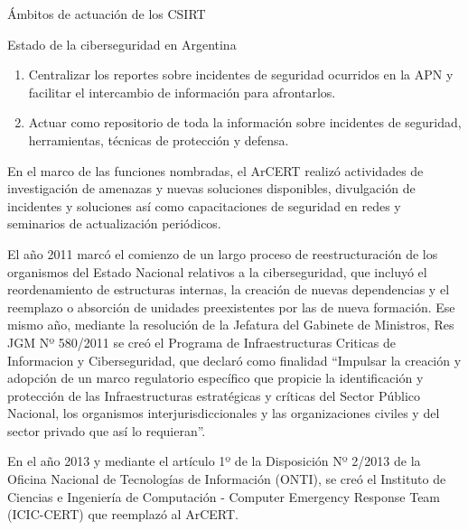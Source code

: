 \begin{section}{Ámbitos de actuación de los CSIRT}
\begin{subsection}{Estado de la ciberseguridad en Argentina}
\begin{enumerate}
            \item Centralizar los reportes sobre incidentes de seguridad ocurridos en la APN y facilitar el intercambio de información para afrontarlos.
            \item Actuar como repositorio de toda la información sobre incidentes de seguridad, herramientas, técnicas de protección y defensa.
        \end{enumerate}
        En el marco de las funciones nombradas, el ArCERT realizó actividades de investigación de amenazas y nuevas soluciones disponibles,  divulgación de incidentes y soluciones así como capacitaciones de seguridad en redes y seminarios de actualización periódicos. \par
        El año 2011 marcó el comienzo de un largo proceso de reestructuración de los organismos del Estado Nacional relativos a la ciberseguridad, que incluyó el reordenamiento de estructuras internas, la creación de nuevas dependencias y el reemplazo o absorción de unidades preexistentes por las de nueva formación. Ese mismo año, mediante la resolución de la Jefatura del Gabinete de Ministros, Res JGM Nº 580/2011 \cite{jef_gab_crease} se creó el Programa de Infraestructuras Criticas de Informacion y Ciberseguridad, que declaró como finalidad “Impulsar la creación y adopción de un marco regulatorio específico que propicie la identificación y protección de las Infraestructuras estratégicas y críticas del Sector Público Nacional, los organismos interjurisdiccionales y las organizaciones civiles y del sector privado que así lo requieran”. \par
        En el año 2013 y mediante el artículo 1º de la Disposición Nº 2/2013 \cite{disp_2_2013} de la Oficina Nacional de Tecnologías de Información (ONTI), se creó el Instituto de Ciencias e Ingeniería de Computación - Computer Emergency Response Team (ICIC-CERT) que reemplazó al ArCERT. \par

\end{subsection}
\end{section}
